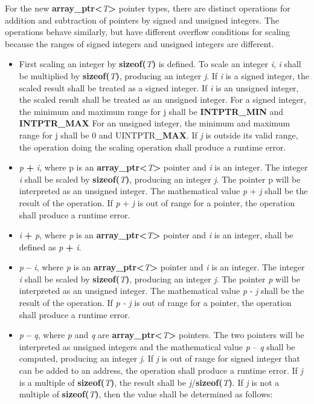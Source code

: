 \documentclass[]{article}
\begin{document}
For the new
\textbf{array\_ptr\textless{}}\emph{T}\textbf{\textgreater{}} pointer
types, there are distinct operations for addition and subtraction of
pointers by signed and unsigned integers. The operations behave
similarly, but have different overflow conditions for scaling because
the ranges of signed integers and unsigned integers are different.

\begin{itemize}
\item
  First scaling an integer by \textbf{sizeof(}\emph{T}\textbf{)} is
  defined. To scale an integer \emph{i}, \emph{i} shall be multiplied by
  \textbf{sizeof(}\emph{T}\textbf{)}, producing an integer \emph{j}. If
  \emph{i} is a signed integer, the scaled result shall be treated as a
  signed integer. If \emph{i} is an unsigned integer, the scaled result
  shall be treated as an unsigned integer. For a signed integer, the
  minimum and maximum range for j shall be \textbf{INTPTR\_MIN} and
  \textbf{INTPTR\_MAX} For an unsigned integer, the minimum and maximum
  range for j shall be 0 and UINTPTR\textbf{\_MAX}. If \emph{j} is
  outside its valid range, the operation doing the scaling operation
  shall produce a runtime error.
\item
  \emph{p} \textbf{+} \emph{i}, where p is an
  \textbf{array\_ptr\textless{}}\emph{T}\textbf{\textgreater{}} pointer
  and \emph{i} is an integer. The integer \emph{i} shall be scaled by
  \textbf{sizeof(}\emph{T}\textbf{)}, producing an integer \emph{j}. The
  pointer p will be interpreted as an unsigned integer. The mathematical
  value \emph{p} + \emph{j} shall be the result of the operation. If
  \emph{p} + \emph{j} is out of range for a pointer, the operation shall
  produce a runtime error.
\item
  \emph{i} \textbf{+} \emph{p}, where \emph{p} is an
  \textbf{array\_ptr\textless{}}\emph{T}\textbf{\textgreater{}} pointer
  and \emph{i} is an integer, shall be defined as \emph{p} \textbf{+}
  \emph{i}.
\item
  \emph{p} \textbf{--} \emph{i}, where \emph{p} is an
  \textbf{array\_ptr\textless{}}\emph{T}\textbf{\textgreater{}} pointer
  and \emph{i} is an integer. The integer \emph{i} shall be scaled by
  \textbf{sizeof(}\emph{T}\textbf{)}, producing an integer \emph{j}. The
  pointer \emph{p} will be interpreted as an unsigned integer. The
  mathematical value \emph{p} - \emph{j} shall be the result of the
  operation. If \emph{p -} \emph{j} is out of range for a pointer, the
  operation shall produce a runtime error.
\item
  \emph{p} \textbf{--} \emph{q}, where \emph{p} and \emph{q} are
  \textbf{array\_ptr\textless{}}\emph{T}\textbf{\textgreater{}}
  pointers. The two pointers will be interpreted as unsigned integers
  and the mathematical value \emph{p} -- \emph{q} shall be computed,
  producing an integer \emph{j}. If \emph{j} is out of range for signed
  integer that can be added to an address, the operation shall produce a
  runtime error. If \emph{j} is a multiple of
  \textbf{sizeof(}\emph{T}\textbf{)}, the result shall be
  \emph{j}/\textbf{sizeof(}\emph{T}\textbf{)}. If \emph{j} is not a
  multiple of \textbf{sizeof(}\emph{T}\textbf{)}, then the value shall
  be determined as follows:


\end{itemize}
\end{document}

